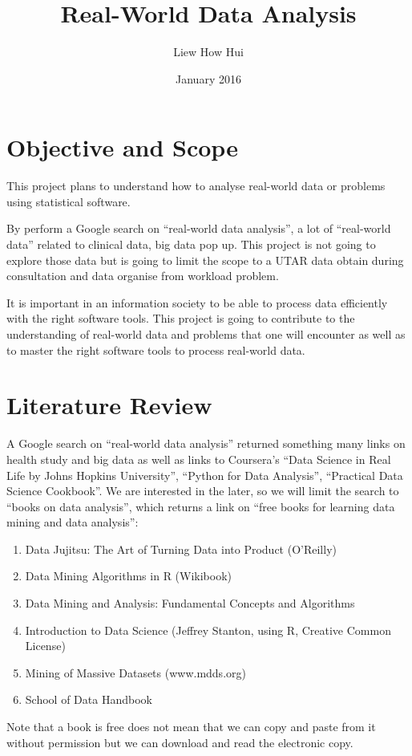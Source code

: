 \documentclass[a4paper,12pt]{article}
\title{Real-World Data Analysis}
\author{Liew How Hui}
\date{\sf January 2016}
\begin{document}
\maketitle

\section{Objective and Scope}

This project plans to understand how to analyse real-world data or
problems using statistical software.

By perform a Google search on ``real-world data analysis'', a lot of
``real-world data'' related to clinical data, big data pop up.  This
project is not going to explore those data but is going to limit the
scope to a UTAR data obtain during consultation and data organise from
workload problem.

It is important in an information society to be able to process
data efficiently with the right software tools.  This project is going
to contribute to the understanding of real-world data and problems
that one will encounter as well as to master the right software tools
to process real-world data.





\section{Literature Review}


A Google search on ``real-world data analysis'' returned something
many links on health study and big data as well as links to Coursera's
``Data Science in Real Life by Johns Hopkins University'', ``Python
for Data Analysis'', ``Practical Data Science Cookbook''.  We are
interested in the later, so we will limit the search to ``books on
data analysis'', which returns a link on ``free books for learning
data mining and data analysis'':
\begin{enumerate}
\item Data Jujitsu: The Art of Turning Data into Product
  (O'Reilly)
\item Data Mining Algorithms in R (Wikibook)
\item Data Mining and Analysis: Fundamental Concepts and Algorithms
\item Introduction to Data Science (Jeffrey Stanton, using R,
  Creative Common License)
\item Mining of Massive Datasets (www.mdds.org)
\item School of Data Handbook
\end{enumerate}
Note that a book is free does not mean that we can copy and paste from
it without permission but we can download and read the electronic
copy.
\end{document}
